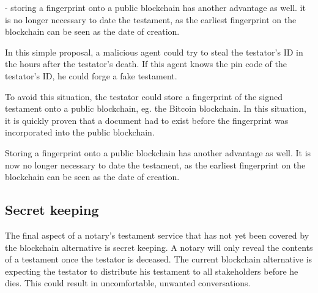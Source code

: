 - storing a fingerprint onto a public blockchain has another advantage as well. it is no longer necessary to date the testament, as the earliest fingerprint on the blockchain can be seen as the date of creation.
\fi

In this simple proposal, a malicious agent could try to steal the testator's ID in the hours after the testator's death. If this agent knows the pin code of the testator's ID, he could forge a fake testament.

To avoid this situation, the testator could store a fingerprint of the signed testament onto a public blockchain, eg. the Bitcoin blockchain. In this situation, it is quickly proven that a document had to exist before the fingerprint was incorporated into the public blockchain. 

Storing a fingerprint onto a public blockchain has another advantage as well. It is now no longer necessary to date the testament, as the earliest fingerprint on the blockchain can be seen as the date of creation.

\subsection{Secret keeping}

\iffalse
secret keeping

- The final aspect of a notary's testament service that has not yet been covered by the blockchain alternative is secret keeping. In general, a notary will only reveal the contents of a testament once the testator is deceased. The current blockchain alternative is expecting the testator to distribute his testament to all stakeholders before he dies. This could result in some uncomfortable conversations.

- An Ethereum script could solve this final aspect. Instead of distributing the testament, the testator could distribute an encrypted version of the testament instead. He could then store the key to decrypt the testament into a script on the Ethereum blockchain. This script would only release the decryption key once the testator has deceased. There are several ways for this script to determine whether the testator is effectively deceased. For example, the testator could distribute keys to family and friends. These keyholders can then vote to release the decryption key, with the testator a veto. Another solution could routinely ask a public governmental database whether the testator has been declared deceased.
\fi

The final aspect of a notary's testament service that has not yet been covered by the blockchain alternative is secret keeping. A notary will only reveal the contents of a testament once the testator is deceased. The current blockchain alternative is expecting the testator to distribute his testament to all stakeholders before he dies. This could result in uncomfortable, unwanted conversations.

